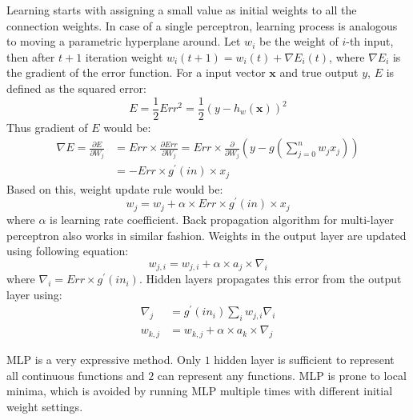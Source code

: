 \begin{appendices}
Learning starts with assigning a small value as initial weights to all the connection weights. In case of a single perceptron, learning process is analogous to moving a parametric hyperplane around. Let $w_i$ be the weight of $i$-th input, then after $t+1$ iteration weight $w_i(t+1) = w_i(t) + \nabla E_i(t)$, where $\nabla E_i$ is the gradient of the error function. For a input vector $\mathbf{x}$ and true output $y$, $E$ is defined as the squared error:
\[
E = \frac{1}{2} Err^2 = \frac{1}{2} (y - h_w(\mathbf{x}))^2
\]
Thus gradient of $E$ would be:
\begin{align*}
\nabla E = \frac{\partial E}{\partial W_j} & = Err \times \frac{\partial Err}{\partial W_j} = Err \times \frac{\partial}{\partial W_j} (y - g(\sum_{j=0}^n w_j x_j)) \\
& = - Err \times g^{\prime} (in) \times x_j
\end{align*}
Based on this, weight update rule would be:
\[
w_j = w_j + \alpha \times Err \times g^{\prime} (in) \times x_j
\]
where $\alpha$ is learning rate coefficient. Back propagation algorithm for multi-layer perceptron also works in similar fashion. Weights in the output layer are updated using following equation:
\[
w_{j,i} = w_{j,i} + \alpha \times a_j \times \nabla_i
\]
where $\nabla_i = Err \times g^\prime(in_i)$. Hidden layers propagates this error from the output layer using:
\begin{align*}
\nabla_j &= g^\prime (in_i) \sum_i w_{j,i} \nabla_i \\
w_{k, j} &= w_{k, j} + \alpha \times a_k \times \nabla_j
\end{align*}

MLP is a very expressive method. Only $1$ hidden layer is sufficient to represent all continuous functions and $2$ can represent any functions. MLP is prone to local minima, which is avoided by running MLP multiple times with different initial weight settings.


\end{appendices}